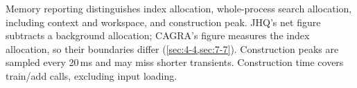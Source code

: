 Memory reporting distinguishes index allocation, whole-process search
allocation, including context and workspace, and construction peak.
JHQ's net figure subtracts a background allocation; CAGRA's figure measures
the index allocation, so their boundaries differ (\cref{sec:4-4,sec:7-7}).
Construction peaks are sampled every 20\,ms and may miss shorter
transients. Construction time covers train/add calls, excluding input
loading.
